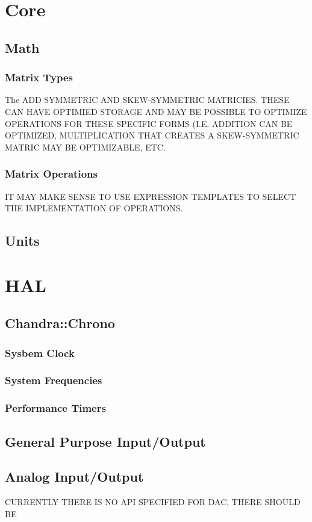 \documentclass[12pt,letterpaper,article]{memoir} %
\begin{document}
\section{Core}
\subsection{Math}
\subsubsection{Matrix Types}
The 
ADD SYMMETRIC AND SKEW-SYMMETRIC MATRICIES.  THESE CAN HAVE OPTIMIED STORAGE AND MAY BE POSSIBLE TO OPTIMIZE OPERATIONS FOR THESE SPECIFIC FORMS (I.E. ADDITION CAN BE OPTIMIZED, MULTIPLICATION THAT CREATES A SKEW-SYMMETRIC MATRIC MAY BE OPTIMIZABLE, ETC.

\subsubsection{Matrix Operations}
IT MAY MAKE SENSE TO USE EXPRESSION TEMPLATES TO SELECT THE IMPLEMENTATION OF OPERATIONS.

\subsection{Units}

\section{HAL}
\subsection{Chandra::Chrono}
\subsubsection{Sysbem Clock}
\subsubsection{System Frequencies}
\subsubsection{Performance Timers}

\subsection{General Purpose Input/Output}
\subsection{Analog Input/Output}
CURRENTLY THERE IS NO API SPECIFIED FOR DAC, THERE SHOULD BE
\end{document}
